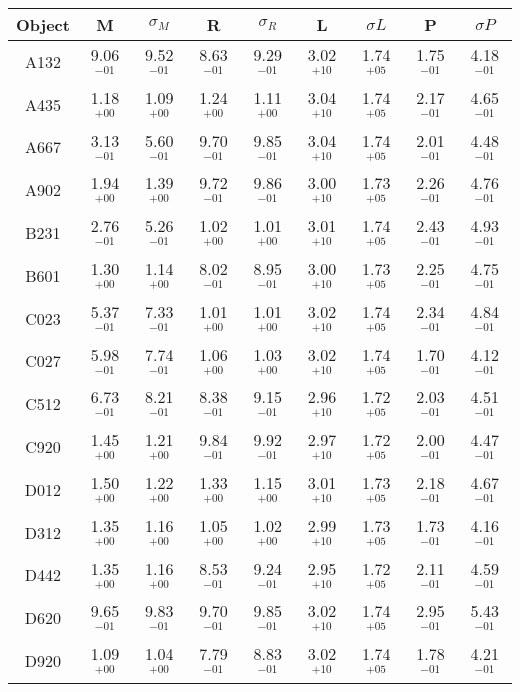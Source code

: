 \small
\vspace{-1cm}
\begin{tabular}{ccccccccc}
\hline
Object & M & $\sigma_{M}$ & R & $\sigma_{R}$ & L & $\sigma{L}$ & P & $\sigma{P}$ \\
\hline
A132 & 9.06$^{-01}$ & 9.52$^{-01}$ & 8.63$^{-01}$ & 9.29$^{-01}$ & 3.02$^{+10}$ & 1.74$^{+05}$ & 1.75$^{-01}$ & 4.18$^{-01}$ \\
A435 & 1.18$^{+00}$ & 1.09$^{+00}$ & 1.24$^{+00}$ & 1.11$^{+00}$ & 3.04$^{+10}$ & 1.74$^{+05}$ & 2.17$^{-01}$ & 4.65$^{-01}$ \\
A667 & 3.13$^{-01}$ & 5.60$^{-01}$ & 9.70$^{-01}$ & 9.85$^{-01}$ & 3.04$^{+10}$ & 1.74$^{+05}$ & 2.01$^{-01}$ & 4.48$^{-01}$ \\
A902 & 1.94$^{+00}$ & 1.39$^{+00}$ & 9.72$^{-01}$ & 9.86$^{-01}$ & 3.00$^{+10}$ & 1.73$^{+05}$ & 2.26$^{-01}$ & 4.76$^{-01}$ \\
B231 & 2.76$^{-01}$ & 5.26$^{-01}$ & 1.02$^{+00}$ & 1.01$^{+00}$ & 3.01$^{+10}$ & 1.74$^{+05}$ & 2.43$^{-01}$ & 4.93$^{-01}$ \\
B601 & 1.30$^{+00}$ & 1.14$^{+00}$ & 8.02$^{-01}$ & 8.95$^{-01}$ & 3.00$^{+10}$ & 1.73$^{+05}$ & 2.25$^{-01}$ & 4.75$^{-01}$ \\
C023 & 5.37$^{-01}$ & 7.33$^{-01}$ & 1.01$^{+00}$ & 1.01$^{+00}$ & 3.02$^{+10}$ & 1.74$^{+05}$ & 2.34$^{-01}$ & 4.84$^{-01}$ \\
C027 & 5.98$^{-01}$ & 7.74$^{-01}$ & 1.06$^{+00}$ & 1.03$^{+00}$ & 3.02$^{+10}$ & 1.74$^{+05}$ & 1.70$^{-01}$ & 4.12$^{-01}$ \\
C512 & 6.73$^{-01}$ & 8.21$^{-01}$ & 8.38$^{-01}$ & 9.15$^{-01}$ & 2.96$^{+10}$ & 1.72$^{+05}$ & 2.03$^{-01}$ & 4.51$^{-01}$ \\
C920 & 1.45$^{+00}$ & 1.21$^{+00}$ & 9.84$^{-01}$ & 9.92$^{-01}$ & 2.97$^{+10}$ & 1.72$^{+05}$ & 2.00$^{-01}$ & 4.47$^{-01}$ \\
D012 & 1.50$^{+00}$ & 1.22$^{+00}$ & 1.33$^{+00}$ & 1.15$^{+00}$ & 3.01$^{+10}$ & 1.73$^{+05}$ & 2.18$^{-01}$ & 4.67$^{-01}$ \\
D312 & 1.35$^{+00}$ & 1.16$^{+00}$ & 1.05$^{+00}$ & 1.02$^{+00}$ & 2.99$^{+10}$ & 1.73$^{+05}$ & 1.73$^{-01}$ & 4.16$^{-01}$ \\
D442 & 1.35$^{+00}$ & 1.16$^{+00}$ & 8.53$^{-01}$ & 9.24$^{-01}$ & 2.95$^{+10}$ & 1.72$^{+05}$ & 2.11$^{-01}$ & 4.59$^{-01}$ \\
D620 & 9.65$^{-01}$ & 9.83$^{-01}$ & 9.70$^{-01}$ & 9.85$^{-01}$ & 3.02$^{+10}$ & 1.74$^{+05}$ & 2.95$^{-01}$ & 5.43$^{-01}$ \\
D920 & 1.09$^{+00}$ & 1.04$^{+00}$ & 7.79$^{-01}$ & 8.83$^{-01}$ & 3.02$^{+10}$ & 1.74$^{+05}$ & 1.78$^{-01}$ & 4.21$^{-01}$ \\
\hline

\end{tabular}
